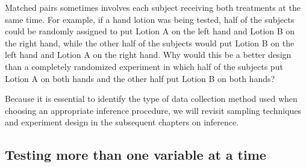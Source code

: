 
\begin{exercisewrap}
\begin{nexercise}
Matched pairs sometimes involves each subject receiving both treatments at the same time. For example, if a hand lotion was being tested, half of the subjects could be randomly assigned to put Lotion A on the left hand and Lotion B on the right hand, while the other half of the subjects would put Lotion B on the left hand and Lotion A on the right hand. Why would this be a better design than a completely randomized experiment in which half of the subjects put Lotion A on both hands and the other half put Lotion B on both hands?\footnotemark\end{nexercise}
\end{exercisewrap}

Because it is essential to identify the type of data collection method used when choosing an appropriate inference procedure, we will revisit sampling techniques and experiment design in the subsequent chapters on inference.



\subsection{Testing more than one variable at a time}

